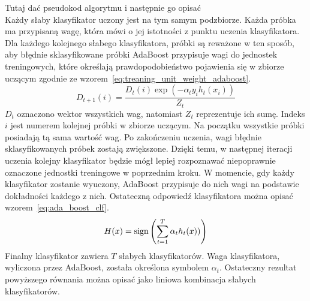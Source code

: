 Tutaj dać pseudokod algorytmu i następnie go opisać\\

Każdy słaby klasyfikator uczony jest na tym samym podzbiorze.
Każda próbka ma przypisaną wagę, która mówi o jej istotności z punktu uczenia klasyfikatora.
Dla każdego kolejnego słabego klasyfikatora, próbki są reważone w ten sposób, aby błędnie sklasyfikowane próbki
AdaBoost przypisuje wagi do jednostek treningowych, które określają prawdopodobieństwo pojawienia się w zbiorze uczącym zgodnie ze wzorem~\eqref{eq:treaning_unit_weight_adaboost}.
\begin{equation}
    \label{eq:treaning_unit_weight_adaboost}
    D_{t+1}(i) = \dfrac{D_t(i) \exp(-\alpha_t y_i h_t(x_i))}{Z_t}
\end{equation}
$D_t$ oznaczono wektor wszystkich wag, natomiast $Z_t$ reprezentuje ich sumę.
Indeks $i$ jest numerem kolejnej próbki w zbiorze uczącym.
Na początku wszystkie próbki posiadają tą sama wartość wag.
Po zakończeniu uczenia, wagi błędnie sklasyfikowanych próbek zostają zwiększone.
Dzięki temu, w następnej iteracji uczenia kolejny klasyfikator będzie mógł lepiej rozpoznawać niepoprawnie oznaczone jednostki treningowe w poprzednim kroku.
W momencie, gdy każdy klasyfikator zostanie wyuczony, AdaBoost przypisuje do nich wagi na podstawie dokładności każdego z nich.
Ostateczną odpowiedź klasyfikatora można opisać wzorem~\eqref{eq:ada_boost_clf}.
\begin{equation}
    \label{eq:ada_boost_clf}
    H(x) = \operatorname{sign}\left(\sum_{t=1}^{T} \alpha_t h_t(x))\right)
\end{equation}
Finalny klasyfikator zawiera $T$ słabych klasyfikatorów.
Waga klasyfikatora, wyliczona przez AdaBoost, została określona symbolem $\alpha_t$.
Ostateczny rezultat powyższego równania można opisać jako liniowa kombinacja słabych klasyfikatorów.

